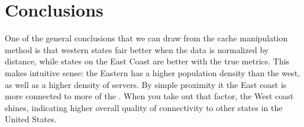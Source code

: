 \section{Conclusions}

One of the general conclusions that we can draw from the \dns cache manipulation method is that western states fair better when the data is normalized by distance, while states on the East Coast are better with the true \rtt metrics. This makes intuitive sense: the Eastern \us has a higher population density than the west, as well as a higher density of \dns servers. By simple proximity it the East coast is more connected to more of the \us. When you take out that factor, the West coast shines, indicating higher overall quality of \dns connectivity to other states in the United States.
